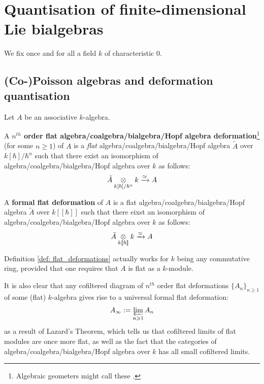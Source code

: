 \section{Quantisation of finite-dimensional Lie bialgebras}
    \begin{convention}
        We fix once and for all a field $k$ of characteristic $0$. 
    \end{convention}
    
    \subsection{(Co-)Poisson algebras and deformation quantisation}
        \begin{definition} \label{def: flat_deformations}
            Let $A$ be an associative $k$-algebra.
            
            A \textbf{$n^{th}$ order flat algebra/coalgebra/bialgebra/Hopf algebra deformation}\footnote{Algebraic geometers might call these .} (for some $n \geq 1$) of $A$ is a \textit{flat} algebra/coalgebra/bialgebra/Hopf algebra $\tilde{A}$ over $k[\hbar]/\hbar^n$ such that there exist an isomorphism of algebra/coalgebra/bialgebra/Hopf algebra over $k$ as follows:
                $$\tilde{A} \tensor_{k[\hbar]/\hbar^n} k \xrightarrow[]{\cong} A$$
                
            A \textbf{formal flat deformation} of $A$ is a flat algebra/coalgebra/bialgebra/Hopf algebra $\tilde{A}$ over $k[\![\hbar]\!]$ such that there eixst an isomorphism of algebra/coalgebra/bialgebra/Hopf algebra over $k$ as follows:
                $$\tilde{A} \tensor_{k[\![\hbar]\!]} k \xrightarrow[]{\cong} A$$
        \end{definition}
        \begin{remark}
            Definition \ref{def: flat_deformations} actually works for $k$ being any commutative ring, provided that one requires that $A$ is flat as a $k$-module. 
            
            It is also clear that any cofiltered diagram of $n^{th}$ order flat deformations $\{A_n\}_{n \geq 1}$ of some (flat) $k$-algebra gives rise to a universal formal flat deformation:
                $$A_{\infty} := \projlim_{n \geq 1} A_n$$
            as a result of Lazard's Theorem, which tells us that cofiltered limits of flat modules are once more flat, as well as the fact that the categories of algebra/coalgebra/bialgebra/Hopf algebra over $k$ has all small cofiltered limits. 
        \end{remark}
